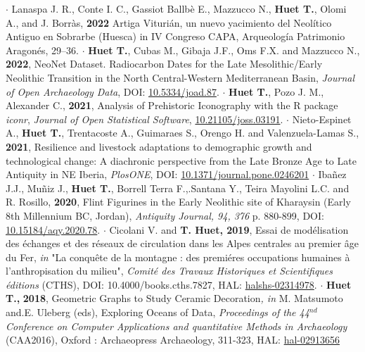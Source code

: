 \documentclass{article}
\begin{document}
\smallbreak
$\cdot$ Lanaspa J. R., Conte I. C., Gassiot Ballbè E., Mazzucco N., \textbf{Huet T.}, Olomi A., and J. Borràs, \textbf{2022} Artiga Viturián, un nuevo yacimiento del Neolítico Antiguo en Sobrarbe (Huesca) in IV Congreso CAPA, Arqueología Patrimonio Aragonés, 29–36.
\smallbreak
$\cdot$ \textbf{Huet T.}, Cubas M., Gibaja J.F., Oms F.X. and Mazzucco N., \textbf{2022}, NeoNet Dataset. Radiocarbon Dates for the Late Mesolithic/Early Neolithic Transition in the North Central-Western Mediterranean Basin, \textit{Journal of Open Archaeology Data}, DOI: \href{http://doi.org/10.5334/joad.87}{10.5334/joad.87}.
\smallbreak
$\cdot$ \textbf{Huet T.}, Pozo J. M., Alexander C., \textbf{2021}, Analysis of Prehistoric Iconography with the R package \textit{iconr}, \textit{Journal of Open Statistical Software}, \href{https://joss.theoj.org/papers/10.21105/joss.03191}{10.21105/joss.03191}.
\smallbreak
$\cdot$ Nieto-Espinet A., \textbf{Huet T.}, Trentacoste A., Guimaraes S., Orengo H. and Valenzuela-Lamas S., \textbf{2021}, Resilience and livestock adaptations to demographic growth and technological change: A diachronic perspective from the Late Bronze Age to Late Antiquity in NE Iberia, \textit{PlosONE}, DOI: \href{https://doi.org/10.1371/journal.pone.0246201}{10.1371/journal.pone.0246201}
\smallbreak
$\cdot$ Iba\~{n}ez J.J., Mu\~{n}iz J., \textbf{Huet T.}, Borrell Terra F.,.Santana Y., Teira Mayolini L.C. and R. Rosillo, \textbf{2020}, Flint Figurines in the Early Neolithic site of Kharaysin (Early 8th Millennium BC, Jordan), \textit{Antiquity Journal, 94, 376} p. 880-899, DOI: \href{https://doi.org/10.15184/aqy.2020.78}{10.15184/aqy.2020.78}.
\smallbreak
$\cdot$ Cicolani V. and \textbf{T. Huet, 2019}, Essai de mod\'{e}lisation des \'{e}changes et des r\'{e}seaux de circulation dans les Alpes centrales au premier \^{a}ge du Fer, \textit{in} "La conqu\^{e}te de la montagne : des premi\'{e}res occupations humaines \`{a} l'anthropisation du milieu", \textit{Comit\'{e} des Travaux Historiques et Scientifiques \'{e}ditions} (CTHS), DOI: 10.4000/books.cths.7827, HAL: \href{https://halshs.archives-ouvertes.fr/halshs-02314978/document}{halshs-02314978}.
\smallbreak
$\cdot$ \textbf{Huet T.,} \textbf{2018}, Geometric Graphs to Study Ceramic Decoration\textit{, in} M. Matsumoto and.E. Uleberg (eds), Exploring Oceans of Data, \textit{Proceedings of the 44${}^{nd\ }$Conference on Computer Applications and quantitative Methods in Archaeology} (CAA2016), Oxford : Archaeopress Archaeology, 311-323, HAL: \href{https://hal.archives-ouvertes.fr/hal-02913656}{hal-02913656}
\smallbreak
\end{document}
